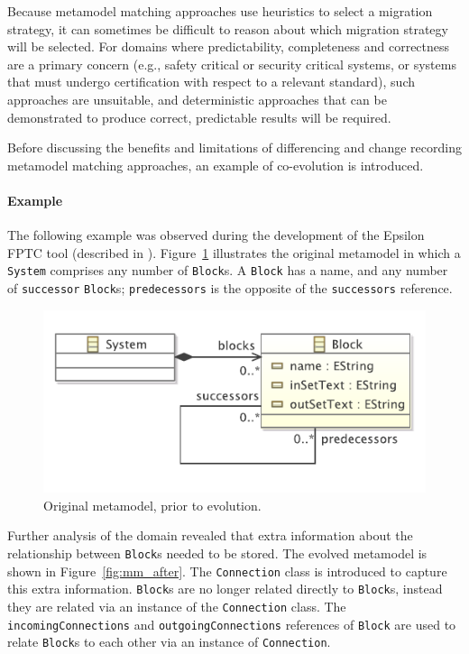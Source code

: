 Because metamodel matching approaches use heuristics to select a migration strategy, it can sometimes be difficult to reason about which migration strategy will be selected. For domains where predictability, completeness and correctness are a primary concern (e.g., safety critical or security critical systems, or systems that must undergo certification with respect to a relevant standard), such approaches are unsuitable, and deterministic approaches that can be demonstrated to produce correct, predictable results will be required. 

Before discussing the benefits and limitations of differencing and change recording metamodel matching approaches, an example of co-evolution is introduced.

\paragraph{Example}
\label{subsubsec:example}
The following example was observed during the development of the Epsilon FPTC tool (described in \cite{paige08fptc}). Figure~\ref{fig:mm_before} illustrates the original metamodel in which a \texttt{System} comprises any number of \texttt{Block}s. A \texttt{Block} has a name, and any number of \texttt{successor} \texttt{Block}s; \texttt{predecessors} is the opposite of the \texttt{successors} reference.

\begin{figure}[htbp]
  \centering
  \includegraphics[scale=0.75]{4.Analysis/fptc_before.pdf}
  \caption{Original metamodel, prior to evolution.}
  \label{fig:mm_before}
\end{figure}

Further analysis of the domain revealed that extra information about the relationship between \texttt{Block}s needed to be stored. The evolved metamodel is shown in Figure~\ref{fig:mm_after}. The \texttt{Connection} class is introduced to capture this extra information. \texttt{Block}s are no longer related directly to \texttt{Block}s, instead they are related via an instance of the \texttt{Connection} class. The \texttt{incomingConnections} and \texttt{outgoingConnections} references of \texttt{Block} are used to relate \texttt{Block}s to each other via an instance of \texttt{Connection}.

